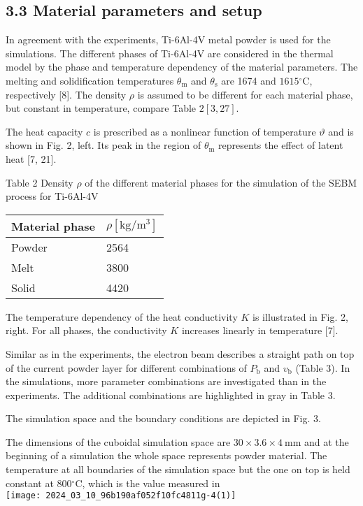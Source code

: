 \documentclass[10pt]{article}
\begin{document}
\subsection*{3.3 Material parameters and setup}
In agreement with the experiments, Ti-6Al-4V metal powder is used for the simulations. The different phases of Ti-6Al-4V are considered in the thermal model by the phase and temperature dependency of the material parameters. The melting and solidification temperatures $\theta_{\mathrm{m}}$ and $\theta_{\mathrm{s}}$ are 1674 and $1615{ }^{\circ} \mathrm{C}$, respectively [8]. The density $\rho$ is assumed to be different for each material phase, but constant in temperature, compare Table $2[3,27]$.

The heat capacity $c$ is prescribed as a nonlinear function of temperature $\vartheta$ and is shown in Fig. 2, left. Its peak in the region of $\theta_{\mathrm{m}}$ represents the effect of latent heat [7, 21].

Table 2 Density $\rho$ of the different material phases for the simulation of the SEBM process for Ti-6Al-4V

\begin{center}
\begin{tabular}{ll}
\hline
Material phase & $\rho\left[\mathrm{kg} / \mathrm{m}^{3}\right]$ \\
\hline
Powder & 2564 \\
Melt & 3800 \\
Solid & 4420 \\
\hline
\end{tabular}
\end{center}

The temperature dependency of the heat conductivity $K$ is illustrated in Fig. 2, right. For all phases, the conductivity $K$ increases linearly in temperature [7].

Similar as in the experiments, the electron beam describes a straight path on top of the current powder layer for different combinations of $P_{\mathrm{b}}$ and $v_{\mathrm{b}}$ (Table 3). In the simulations, more parameter combinations are investigated than in the experiments. The additional combinations are highlighted in gray in Table 3.

The simulation space and the boundary conditions are depicted in Fig. 3.

The dimensions of the cuboidal simulation space are $30 \times 3.6 \times 4 \mathrm{~mm}$ and at the beginning of a simulation the whole space represents powder material. The temperature at all boundaries of the simulation space but the one on top is held constant at $800{ }^{\circ} \mathrm{C}$, which is the value measured in\\
\texttt{[image: 2024\_03\_10\_96b190af052f10fc4811g-4(1)]}
\end{document}
